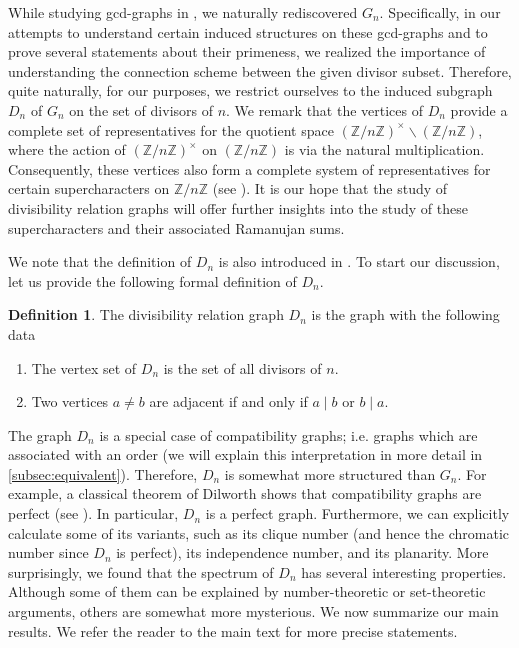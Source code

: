 \documentclass[11pt,a4paper]{amsart}
\theoremstyle{definition}
\newtheorem{definition}[thm]{Definition}
\numberwithin{equation}{section}
\begin{document}
While studying gcd-graphs in \cite{MTT5, nguyen2025gcd}, we naturally rediscovered $G_n$. Specifically, in our attempts to understand certain induced structures on these gcd-graphs and to prove several statements about their primeness, we realized the importance of understanding the connection scheme between the given divisor subset. Therefore, quite naturally, for our purposes, we restrict ourselves to the induced subgraph $D_n$ of $G_n$ on the set of divisors of $n$. We remark that the vertices of $D_n$ provide a complete set of representatives for the quotient space $(\mathbb{Z}/n\mathbb{Z})^{\times} \backslash (\mathbb{Z}/n\mathbb{Z})$, where the action of $(\mathbb{Z}/n\mathbb{Z})^{\times}$ on $(\mathbb{Z}/n\mathbb{Z} )$ is via the natural multiplication. Consequently, these vertices also form a complete system of representatives for certain supercharacters on $\mathbb{Z}/n\mathbb{Z}$ (see \cite{fowler2014ramanujan}). It is our hope that the study of divisibility relation graphs will offer further insights into the study of these supercharacters and their associated Ramanujan sums.





We note that the definition of $D_n$ is also introduced in \cite[Definition 19]{divisor_graph_1}.  To start our discussion, let us provide the following formal definition of $D_n.$


\begin{definition}
The divisibility relation graph $D_n$ is the graph with the following data 

\begin{enumerate}
    \item The vertex set of $D_n$ is the set of all divisors of $n.$
    \item Two vertices $a\neq b$ are adjacent if and only if $a \mid b$ or $b \mid a.$
\end{enumerate}
\end{definition}
The graph $D_n$ is a special case of compatibility graphs; i.e. graphs which are associated with an order (we will explain this interpretation in more detail in \cref{subsec:equivalent}). Therefore, $D_n$ is somewhat more structured than $G_n$. For example, a classical theorem of Dilworth shows that compatibility graphs are perfect (see \cite{Dilworth, Fulkerson}). In particular, $D_n$ is a perfect graph. Furthermore, we can explicitly calculate some of its variants, such as its clique number (and hence the chromatic number since $D_n$ is perfect), its independence number, and its planarity. More surprisingly, we found that the spectrum of $D_n$ has several interesting properties. Although some of them can be explained by number-theoretic or set-theoretic arguments, others are somewhat more mysterious. We now summarize our main results. We refer the reader to the main text for more precise statements.
\end{document}
